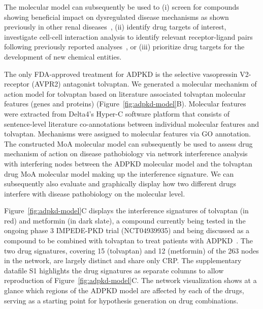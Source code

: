 The molecular model can subsequently be used to (i) screen for compounds showing beneficial impact on dysregulated disease mechanisms as shown previously in other renal diseases~\citep{gebeshuberComputationalDrugRepositioning2023}, (ii) identify drug targets of interest, investigate cell-cell interaction analysis to identify relevant receptor-ligand pairs following previously reported analyses~\citep{evgeniouMetaAnalysisHumanTranscriptomics2021}, or (iii) prioritize drug targets for the development of new chemical entities.

The only FDA-approved treatment for ADPKD is the selective vasopressin V2-receptor (AVPR2) antagonist tolvaptan. We generated a molecular mechanism of action model for tolvaptan based on literature associated tolvaptan molecular features (genes and proteins) (Figure~\ref{fig:adpkd-model}B). Molecular features were extracted from Delta4's Hyper-C software platform that consists of sentence-level literature co-annotations between individual molecular features and tolvaptan. Mechanisms were assigned to molecular features via GO annotation. The constructed MoA molecular model can subsequently be used to assess drug mechanism of action on disease pathobiology via network interference analysis~\citep{heerspinkCanagliflozinReducesInflammation2019,gebeshuberComputationalDrugRepositioning2023,evgeniouIntegrativeAnalysisDrug2025} with interfering nodes between the ADPKD molecular model and the tolvaptan drug MoA molecular model making up the interference signature. We can subsequently also evaluate and graphically display how two different drugs interfere with disease pathobiology on the molecular level.

Figure~\ref{fig:adpkd-model}C displays the interference signatures of tolvaptan (in red) and metformin (in dark slate), a compound currently being tested in the ongoing phase 3 IMPEDE-PKD trial (NCT04939935) and being discussed as a compound to be combined with tolvaptan to treat patients with ADPKD~\citep{stanleySecondaryAnalysisConcurrent2024}. The two drug signatures, covering 15 (tolvaptan) and 12 (metformin) of the 263 nodes in the network, are largely distinct and share only CRP. The supplementary datafile S1 highlights the drug signatures as separate columns to allow reproduction of Figure~\ref{fig:adpkd-model}C. The network visualization shows at a glance which regions of the ADPKD model are affected by each of the drugs, serving as a starting point for hypothesis generation on drug combinations.

